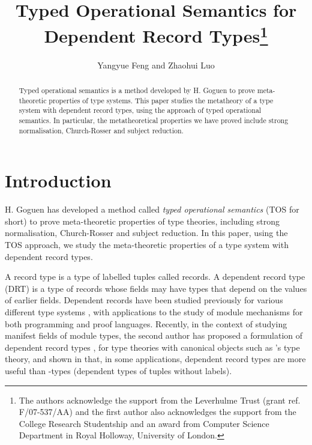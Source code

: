 \documentclass[submission,copyright,creativecommons]{eptcs}
\title{Typed Operational Semantics for Dependent Record Types\thanks{The authors acknowledge the support from the Leverhulme Trust (grant ref. F/07-537/AA) and the first author also acknowledges the support from the College Research Studentship and an award from Computer Science Department in Royal Holloway, University of London.}}
\author{Yangyue Feng and Zhaohui Luo
\institute{Department of Computer Science\\ Royal Holloway, University of London \\
Egham, Surrey TW20 0EX, UK\\}
\email{\{yangyue,zhaohui\}@cs.rhul.ac.uk}
}
\begin{document}
\maketitle

\begin{abstract}
Typed operational semantics is a method developed by H. Goguen to prove meta-theoretic properties of type systems. This paper studies the metatheory of a type system with dependent record types, using the approach of typed operational semantics. In particular, the metatheoretical properties we have proved include strong normalisation, Church-Rosser and subject reduction.
\end{abstract}


\section{Introduction}

\par{H. Goguen \cite{healf:thesis,healf:TLCA99YY} has developed a method called \emph{typed operational semantics} (TOS for short) to prove meta-theoretic properties of type theories, including strong normalisation, Church-Rosser and subject reduction. In this paper, using the TOS approach, we study the meta-theoretic properties of a type system with dependent record types. }

\par{A record type is a type of labelled tuples called records.  A dependent record type (DRT) is a type of records whose fields may have types that depend on the values of earlier fields.  Dependent records have been studied previously for various different type systems \cite{Harper-Lillibridge93, bet-tar:subtyping98, Pollack:records02, ctp:semantic-records05}, with applications to the study of module mechanisms for both programming and proof languages. Recently, in the context of studying manifest fields of module types, the second author has proposed a formulation of dependent record types \cite{luo:TYPES08}, for type theories with canonical objects such as \ML's type theory, and shown in \cite{luo:MLPA09} that, in some applications, dependent record types are more useful than -types (dependent types of tuples without labels). }
\end{document}
